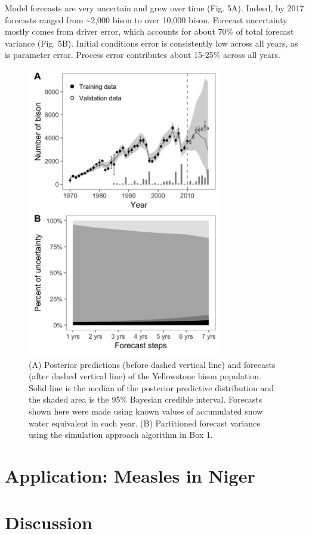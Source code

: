 \documentclass[12pt,]{article}
\begin{document}
Model forecasts are very uncertain and grew over time (Fig. 5A). Indeed,
by 2017 forecasts ranged from \textasciitilde{}2,000 bison to over
10,000 bison. Forecast uncertainty mostly comes from driver error, which
accounts for about 70\% of total forecast variance (Fig. 5B). Initial
conditions error is consistently low across all years, as is parameter
error. Process error contributes about 15-25\% across all years.

\begin{figure}[!ht]
  \centering
      \includegraphics[height=5in]{../figures/bison_combined.png}
  \caption{(A) Posterior predictions (before dashed vertical line) and forecasts (after dashed vertical line) of the Yellowstone bison population. Solid line is the median of the posterior predictive distribution and the shaded area is the 95\% Bayesian credible interval. Forecasts shown here were made using known values of accumulated snow water equivalent in each year. (B) Partitioned forecast variance using the simulation approach algorithm in Box 1.}
\end{figure}

\section{Application: Measles in
Niger}\label{application-measles-in-niger}

\section{Discussion}\label{discussion}
\end{document}
